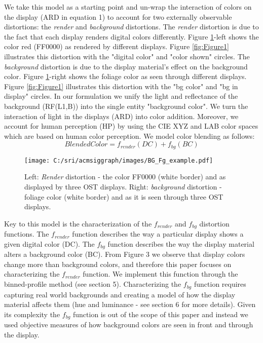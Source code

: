 \documentclass[annual]{acmsiggraph}
\begin{document}
We take this model as a starting point and un-wrap the interaction of colors on the display (ARD in equation 1) to account for two externally observable distortions: the \textit{render} and \textit{background} distortions. The \textit{render} distortion is due to the fact that each display renders digital colors differently. Figure \ref{fig:Figure3}-left shows the color red (FF0000) as rendered by different displays. Figure \ref{fig:Figure1} illustrates this distortion with the "digital color" and "color shown" circles. The \textit{background} distortion is due to the display material's effect on the background color. Figure \ref{fig:Figure3}-right shows the foliage color as seen through different displays. Figure \ref{fig:Figure1} illustrates this distortion with the "bg color" and "bg in display" circles. In our formulation we unify the light and reflectance of the background (RF(L1,B)) into the single entity "background color". We turn the interaction of light in the displays (ARD) into color addition. Moreover, we account for human perception (HP) by using the CIE XYZ and LAB color spaces which are based on human color perception. We model color blending as follows:
\begin{equation}
Blended Color=f_{render}(DC)+f_{bg}(BC)
\end{equation}

\begin{figure}[ht]
  \centering
  \texttt{[image: C:/sri/acmsiggraph/images/BG\_Fg\_example.pdf]}
  \caption{Left: \textit{Render} distortion - the color FF0000 (white border) and as displayed by three OST displays. Right: \textit{background} distortion - foliage color (white border) and as it is seen through three OST displays.}
  \label{fig:Figure3}
\end{figure}

Key to this model is the characterization of the $f_{render}$ and $f_{bg}$ distortion functions. The $f_{render}$ function describes the way a particular display shows a given digital color (DC). The $f_{bg}$ function describes the way the display material alters a background color (BC). From Figure 3 we observe that display colors change more than background colors, and therefore this paper focuses on characterizing the $f_{render}$ function. We implement this function through the binned-profile method (see section 5). Characterizing the $f_{bg}$ function requires capturing real world backgrounds \cite{Hong:2001} and creating a model of how the display material affects them (hue and luminance - see section 6 for more details). Given its complexity the $f_{bg}$ function is out of the scope of this paper and instead we used objective measures of how background colors are seen in front and through the display.
\end{document}
